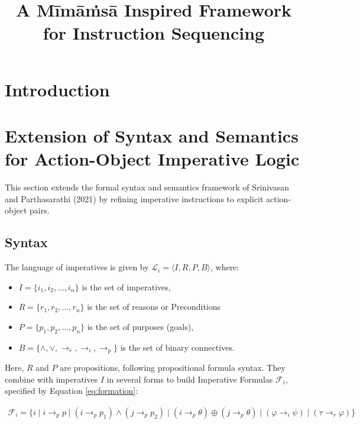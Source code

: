\documentclass[a4paper,11pt]{lmcs}
\title{A M\={i}m\={a}\.{m}s\={a} Inspired Framework for Instruction Sequencing}
\author{}
\begin{document}
\maketitle

\begin{abstract}

\end{abstract}

\section{Introduction}

\section{Extension of Syntax and Semantics for Action-Object Imperative Logic}
This section extends the formal syntax and semantics framework of Srinivasan and Parthasarathi (2021) \cite{mira} by refining imperative instructions to explicit action-object pairs.
\subsection{Syntax}
\label{sec:syntax}
The language of imperatives is given by \(\mathcal{L}_i = \langle I, R, P, B \rangle\), where:
\begin{itemize}
  \item \(I = \{ i_1, i_2, \ldots, i_n \}\) is the set of imperatives,
  \item \(R = \{ r_1, r_2, \ldots, r_n \}\) is the set of reasons or Preconditions
  \item \(P = \{ p_1, p_2, \ldots, p_n \}\) is the set of purposes (goals),
  \item \(B = \{ \wedge, \vee, \rightarrow_r, \rightarrow_i, \rightarrow_p \}\) is the set of binary connectives.
\end{itemize}

Here, \(R\) and \(P\) are propositions, following propositional formula syntax. They combine with imperatives \(I\) in several forms to build Imperative Formulas \(\mathcal{F}_i\), specified by Equation \ref{eq:formation}:

\begin{eqnarray}
\label{eq:formation}
\mathcal{F}_i = \{
i \mid i \rightarrow_p p \mid (i \rightarrow_p p_1) \wedge (j \rightarrow_p p_2) \mid (i \rightarrow_p \theta) \oplus (j \rightarrow_p \theta) \mid (\varphi \rightarrow_i \psi) \mid (\tau \rightarrow_r \varphi)
\}
\end{eqnarray}
\end{document}
